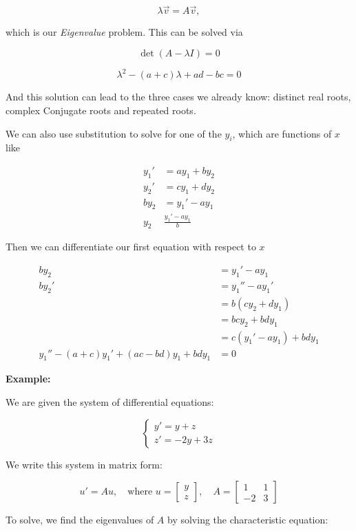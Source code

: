 \[
    \lambda \vec{v} = A \vec{v},
\]

which is our \emph{Eigenvalue} problem. This can be solved via

\[
    \det(A - \lambda I) = 0
\]

\[
    \lambda^{2} - (a + c)\lambda + ad - bc = 0
\]

And this solution can lead to the three cases we already know: distinct real roots, complex Conjugate 
roots and repeated roots.

We can also use substitution to solve for one of the \(y_i\), which are functions of \(x\) like

\begin{align*}
    y_1 ' &= ay_1 + by_2\\
    y_2 ' &= cy_1 + dy_2\\
    by_2 &= y_1' - ay_1\\
    y_2 & \frac{y_1' - ay_1}{b}
\end{align*}

Then we can differentiate our first equation with respect to \(x\)

\begin{align*}
    by_2 &= y_1' - ay_1\\
    by_2' &= y_1'' - ay_1'\\
    &= b (cy_2 + dy_1)\\
    &= bcy_2 + bdy_1\\
    &= c (y_1' -ay_1 ) + bdy_1\\
    y_1'' - (a + c)y_1' + (ac - bd)y_1 + bdy_1 &= 0
\end{align*}

\textbf{Example:}

We are given the system of differential equations:

\[
    \begin{cases}
    y' = y + z \\
    z' = -2y + 3z
    \end{cases}
\]

We write this system in matrix form:

\[
    u' = Au, \quad \text{where } u = \begin{bmatrix} y \\ z \end{bmatrix}, \quad A = \begin{bmatrix} 1 & 
        1 \\ -2 & 3 \end{bmatrix}
\]

To solve, we find the eigenvalues of \(A\) by solving the characteristic equation:

